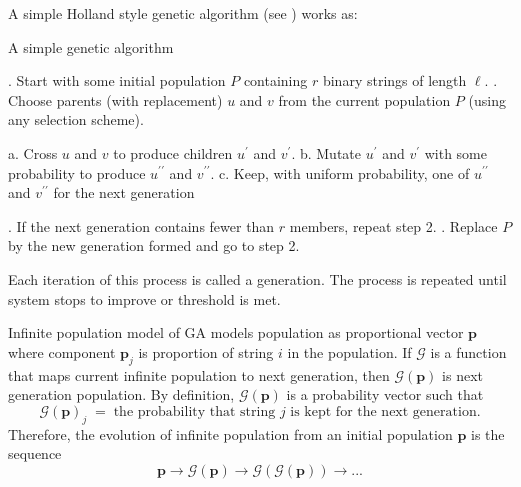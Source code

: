 A simple Holland style genetic algorithm (see \cite{Holland1975}) works as:
\begin{algorithm}
\label{realGA}
\caption*{A simple genetic algorithm}
\begin{algorithmic}[1]
. Start with some initial population $P$ containing $r$ binary strings of length $\ell$.
. Choose parents (with replacement) $u$ and $v$ from the current population $P$ (using any selection scheme).

  \Statex \hspace{\algorithmicindent} a. Cross $u$ and $v$ to produce children $u^\prime$ and $v^\prime$.
  \Statex \hspace{\algorithmicindent} b. Mutate $u^\prime$ and $v^\prime$ with some probability to produce $u^{\prime\prime}$ and $v^{\prime\prime}$.
  \Statex \hspace{\algorithmicindent} c. Keep, with uniform probability, one of $u^{\prime\prime}$ and $v^{\prime\prime}$ for the next generation
 
. If the next generation contains fewer than $r$ members, repeat step 2.
. Replace $P$ by the new generation formed and go to step 2.
\end{algorithmic}
\end{algorithm}

Each iteration of this process is called a generation. 
The process is repeated until system stops to improve or threshold is met.

Infinite population model of GA models population as proportional vector $\bm{p}$ where component $\bm{p}_j$ 
is proportion of string $i$ in the population. If $\mathcal{G}$ is a function that maps current infinite population to 
next generation, then $\mathcal{G}(\bm{p})$ is next generation population. By definition, $\mathcal{G}(\bm{p})$ is a probability 
vector such that 
\[
\mathcal{G}(\bm{p})_j \; = \; \text{the probability that string $j$ is kept for the next generation}.
\]
Therefore, the evolution of infinite population from an initial population $\bm{p}$ is the sequence
\[ \bm{p} \to \mathcal{G}(\bm{p}) \to  {\mathcal{G}}(\mathcal{G}(\bm{p})) \to... \]

